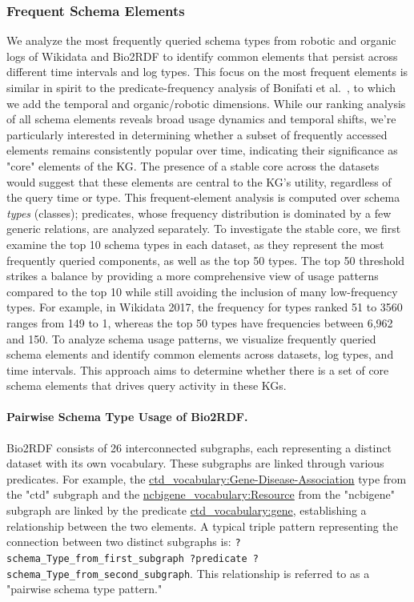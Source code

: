 \documentclass[sw]{iosart2x}
\begin{document}
\subsubsection{Frequent Schema Elements} \label{sec:s62}
We analyze the most frequently queried schema types from robotic and organic logs of Wikidata and Bio2RDF to identify common elements that persist across different time intervals and log types. This focus on the most frequent elements is similar in spirit to the predicate-frequency analysis of Bonifati et al.\ \cite{bonifati2019navigating}, to which we add the temporal and organic/robotic dimensions. While our ranking analysis of all schema elements reveals broad usage dynamics and temporal shifts, we're particularly interested in determining whether a subset of frequently accessed elements remains consistently popular over time, indicating their significance as "core" elements of the KG. The presence of a stable core across the datasets would suggest that these elements are central to the KG’s utility, regardless of the query time or type. This frequent-element analysis is computed over schema \emph{types} (classes); predicates, whose frequency distribution is dominated by a few generic relations, are analyzed separately. To investigate the stable core, we first examine the top 10 schema types in each dataset, as they represent the most frequently queried components, as well as the top 50 types. The top 50 threshold strikes a balance by providing a more comprehensive view of usage patterns compared to the top 10 while still avoiding the inclusion of many low-frequency types. For example, in Wikidata 2017, the frequency for types ranked 51 to 3560 ranges from 149 to 1, whereas the top 50 types have frequencies between 6,962 and 150. To analyze schema usage patterns, we visualize frequently queried schema elements and identify common elements across datasets, log types, and time intervals. This approach aims to determine whether there is a set of core schema elements that drives query activity in these KGs.


\paragraph{\textbf{Pairwise Schema Type Usage of Bio2RDF.}}
Bio2RDF consists of 26 interconnected subgraphs, each representing a distinct dataset with its own vocabulary. These subgraphs are linked through various predicates. For example, the \url{ctd_vocabulary:Gene-Disease-Association} type from the "ctd" subgraph and the \url{ncbigene_vocabulary:Resource} from the "ncbigene" subgraph are linked by the predicate \url{ctd_vocabulary:gene}, establishing a relationship between the two elements. A typical triple pattern representing the connection between two distinct subgraphs is: \sloppy \texttt{?schema\_Type\_from\_first\_subgraph ?predicate ?schema\_Type\_from\_second\_subgraph}. This relationship is referred to as a "pairwise schema type pattern."
\end{document}
